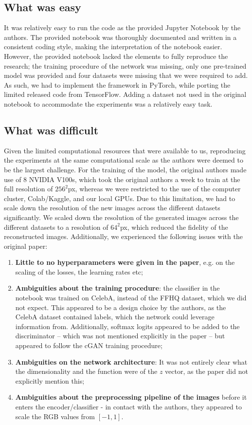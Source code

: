 \subsection{What was easy}
It was relatively easy to run the code as the provided Jupyter Notebook by the authors. The provided notebook was thoroughly documented and written in a consistent coding style, making the interpretation of the notebook easier. However, the provided notebook lacked the elements to fully reproduce the research; the training procedure of the network was missing, only one pre-trained model was provided and four datasets were missing that we were required to add. As such, we had to implement the framework in PyTorch, while porting the limited released code from TensorFlow. Adding a dataset not used in the original notebook to accommodate the experiments was a relatively easy task.

\subsection{What was difficult}

Given the limited computational resources that were available to us, reproducing the experiments at the same computational scale as the authors were deemed to be the largest challenge. For the training of the model, the original authors made use of 8 NVIDIA V100s, which took the original authors a week to train at the full resolution of $256^2$px, whereas we were restricted to the use of the computer cluster, Colab/Kaggle, and our local GPUs. Due to this limitation, we had to scale down the resolution of the new images across the different datasets significantly. We scaled down the resolution of the generated images across the different datasets to a resolution of $64^2$px, which reduced the fidelity of the reconstructed images.  Additionally, we experienced the following issues with the original paper:

\begin{enumerate}
    \item \textbf{Little to no hyperparameters were given in the paper}, e.g. on the scaling of the losses, the learning rates etc;
    \item \textbf{Ambiguities about the training procedure}: the classifier in the notebook was trained on CelebA, instead of the FFHQ dataset, which we did not expect. This appeared to be a design choice by the authors, as the CelebA dataset contained labels, which the network could leverage information from. Additionally, softmax logits appeared to be added to the discriminator -- which was not mentioned explicitly in the paper -- but appeared to follow the cGAN \cite{mirza2014conditional} training procedure;
    \item \textbf{Ambiguities on the network architecture}: It was not entirely clear what the dimensionality and the function were of the $z$ vector, as the paper did not explicitly mention this;
    \item \textbf{Ambiguities about the preprocessing pipeline of the images} before it enters the encoder/classifier - in contact with the authors, they appeared to scale the RGB values from $[-1,1]$.
\end{enumerate}

